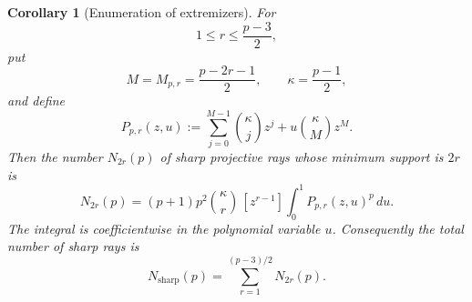 \documentclass[11pt]{article}
\newtheorem{corollary}[theorem]{Corollary}
\begin{document}
\begin{corollary}[Enumeration of extremizers]
\label{cor:complete-extremizer-count}
For
\[
 1\le r\le\frac{p-3}{2},
\]
put
\[
 M=M_{p,r}=\frac{p-2r-1}{2},
 \qquad
 \kappa=\frac{p-1}{2},
\]
and define
\begin{equation}
 P_{p,r}(z,u)
 :=
 \sum_{j=0}^{M-1}\binom{\kappa}{j} z^j
 +
 u\binom{\kappa}{M}z^M.
 \label{eq:counting-polynomial}
\end{equation}
Then the number \(N_{2r}(p)\) of sharp projective rays whose minimum
support is \(2r\) is
\begin{equation}
 \boxed{
 N_{2r}(p)
 =
 (p+1)p^2\binom{\kappa}{r}
 \,[z^{r-1}]
 \int_0^1
 P_{p,r}(z,u)^p\,du.
 }
 \label{eq:complete-count-formula}
\end{equation}
The integral is coefficientwise in the polynomial variable \(u\).
Consequently the total number of sharp rays is
\begin{equation}
 N_{\mathrm{sharp}}(p)
 =
 \sum_{r=1}^{(p-3)/2}N_{2r}(p).
 \label{eq:total-sharp-count}
\end{equation}
\end{corollary}
\end{document}
